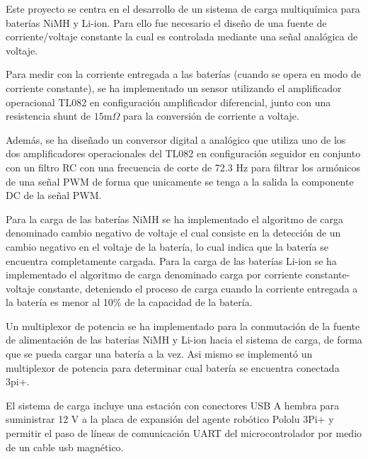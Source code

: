 Este proyecto se centra en el desarrollo de un sistema de carga multiquímica para baterías NiMH y Li-ion.
Para ello fue necesario el diseño de  una fuente de corriente/voltaje constante 
la cual es  controlada mediante una señal analógica de voltaje.

Para medir con la corriente entregada a las baterías (cuando se opera en modo de
corriente constante), se ha implementado un sensor utilizando el amplificador
operacional TL082 en configuración amplificador diferencial, 
junto con una resistencia shunt de $15 \text{m}\Omega$ para la conversión de corriente a
voltaje.

Además, se ha diseñado un conversor digital a analógico que utiliza
uno de los dos amplificadores operacionales del TL082 en configuración seguidor
en conjunto con un filtro RC con una frecuencia de corte de 72.3 Hz para filtrar
los armónicos de una señal PWM de forma que unicamente se tenga a la salida la
componente DC de la señal PWM.

Para la carga de las baterías NiMH se ha implementado el algoritmo de carga 
denominado cambio negativo de voltaje el cual consiste en la detección de un
cambio negativo en el voltaje de la batería, lo cual indica que la batería 
se encuentra completamente cargada. Para la carga de las baterías 
Li-ion se ha implementado el algoritmo de carga
denominado carga por corriente constante-voltaje constante, deteniendo el proceso
de carga cuando la corriente entregada a la batería es menor al 10\% de la capacidad
de la batería.

Un multiplexor de potencia se ha implementado para la conmutación de la fuente de
alimentación de las baterías NiMH y Li-ion hacia el sistema de carga, de forma que
se pueda cargar una batería a la vez. Asi mismo se implementó un multiplexor de
potencia para determinar cual batería se encuentra conectada 3pi+.
 
El sistema de carga incluye una estación con conectores USB A hembra para
suministrar 12 V a la placa de expansión del agente robótico Pololu 3Pi+ y 
permitir el paso de líneas de comunicación UART del microcontrolador por medio
de un cable usb magnético.


